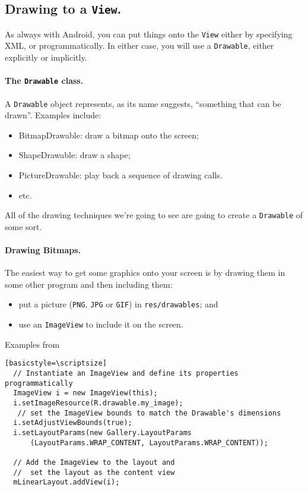\subsection*{Drawing to a {\tt View}.} 
As always with Android, you can put things onto the {\tt View} either 
by specifying XML, or programmatically. In either case, you will use
a {\tt Drawable}, either explicitly or implicitly.

\paragraph{The {\tt Drawable} class.}
A {\tt Drawable} object represents, as its name suggests, 
``something that can be drawn''. Examples include:
\begin{itemize}
\item BitmapDrawable: draw a bitmap onto the screen;
\item ShapeDrawable: draw a shape;
\item PictureDrawable: play back a sequence of drawing calls.
\item etc.
\end{itemize}
All of the drawing techniques we're going to see are going
to create a {\tt Drawable} of some sort.

\paragraph{Drawing Bitmaps.} 
The easiest way to get some graphics onto your screen is by
drawing them in some other program and then including them:
\begin{itemize}
\item put a picture ({\tt PNG}, {\tt JPG} or {\tt GIF}) in {\tt res/drawables}; and
\item use an {\tt ImageView} to include it on the screen.
\end{itemize}

Examples from~\cite{android:graphics}
\begin{verbatim}[basicstyle=\scriptsize]
  // Instantiate an ImageView and define its properties programmatically
  ImageView i = new ImageView(this);
  i.setImageResource(R.drawable.my_image);
   // set the ImageView bounds to match the Drawable's dimensions
  i.setAdjustViewBounds(true);
  i.setLayoutParams(new Gallery.LayoutParams
      (LayoutParams.WRAP_CONTENT, LayoutParams.WRAP_CONTENT));

  // Add the ImageView to the layout and 
  //  set the layout as the content view
  mLinearLayout.addView(i);
\end{verbatim}

